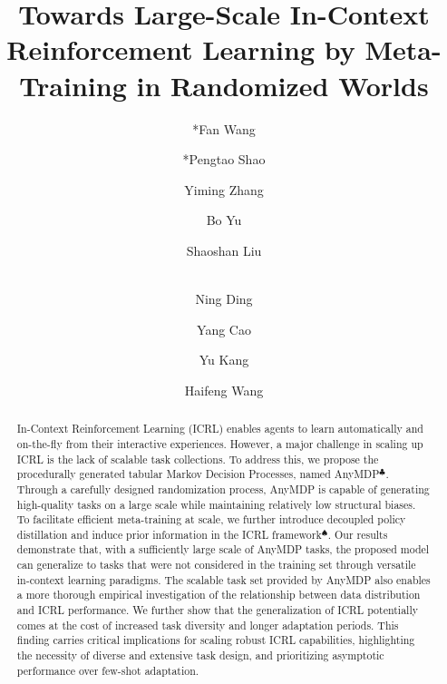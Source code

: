 \documentclass{article}
\begin{document}
\title{Towards Large-Scale In-Context Reinforcement Learning by Meta-Training in Randomized Worlds}
\renewcommand{\thefootnote}{\fnsymbol{footnote}}
\author[1,2]{*\dag Fan Wang}
\author[2]{*Pengtao Shao}
\author[2]{Yiming Zhang}
\author[2]{Bo Yu}
\author[2]{\dag Shaoshan Liu}
\author[2]{\\Ning Ding}
\author[1,3]{Yang Cao}
\author[1,3]{Yu Kang}
\author[4]{Haifeng Wang}
\maketitle
\def\thefootnote{*}
\def\thefootnote{\dag}
\def\thefootnote{$\clubsuit$}
\def\thefootnote{$\spadesuit$}
\begin{abstract}
In-Context Reinforcement Learning (ICRL) enables agents to learn automatically and on-the-fly from their interactive experiences. However, a major challenge in scaling up ICRL is the lack of scalable task collections. To address this, we propose the procedurally generated tabular Markov Decision Processes, named AnyMDP$^\clubsuit$. Through a carefully designed randomization process, AnyMDP is capable of generating high-quality tasks on a large scale while maintaining relatively low structural biases.
To facilitate efficient meta-training at scale, we further introduce decoupled policy distillation and induce prior information in the ICRL framework$^\spadesuit$.
Our results demonstrate that, with a sufficiently large scale of AnyMDP tasks, the proposed model can generalize to tasks that were not considered in the training set through versatile in-context learning paradigms.
The scalable task set provided by AnyMDP also enables a more thorough empirical investigation of the relationship between data distribution and ICRL performance. We further show that the generalization of ICRL potentially comes at the cost of increased task diversity and longer adaptation periods. This finding carries critical implications for scaling robust ICRL capabilities, highlighting the necessity of diverse and extensive task design, and prioritizing asymptotic performance over few-shot adaptation.
\end{abstract}
\end{document}
